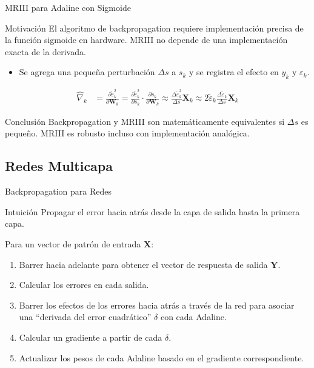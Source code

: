 \documentclass[aspectratio=169,utf8,spanish]{beamer}
\begin{document}
\begin{frame}{MRIII para Adaline con Sigmoide}
  \begin{block}{Motivación}
    El algoritmo de backpropagation requiere implementación precisa de la función sigmoide en hardware. MRIII no depende de una implementación exacta de la derivada.
  \end{block}

  \begin{itemize}
    \item Se agrega una pequeña perturbación $\Delta s$ a $s_k$ y se registra el efecto en $y_k$ y $\varepsilon_k$.
  \end{itemize}

  \begin{align*}
    \hat{\nabla}_k &= \frac{\partial \tilde{\varepsilon}_k^2}{\partial \mathbf{W}_k}
    = \frac{\partial \tilde{\varepsilon}_k^2}{\partial s_k} \cdot \frac{\partial s_k}{\partial \mathbf{W}_k}
    \approx \frac{\Delta\tilde{\varepsilon}_k^2}{\Delta s} \mathbf{X}_k
    \approx 2\tilde{\varepsilon}_k \frac{\Delta\tilde{\varepsilon}_k}{\Delta s} \mathbf{X}_k
  \end{align*}

  \begin{block}{Conclusión}
    Backpropagation y MRIII son matemáticamente equivalentes si $\Delta s$ es pequeño. MRIII es robusto incluso con implementación analógica.
  \end{block}
\end{frame}

\subsection{Redes Multicapa}

\begin{frame}{Backpropagation para Redes}
  \begin{block}{Intuición}
    Propagar el error hacia atrás desde la capa de salida hasta la primera capa.
  \end{block}

  Para un vector de patrón de entrada $\mathbf{X}$:
  \begin{enumerate}
    \item Barrer hacia adelante para obtener el vector de respuesta de salida $\mathbf{Y}$.
    \item Calcular los errores en cada salida.
    \item Barrer los efectos de los errores hacia atrás a través de la red para asociar una ``derivada del error cuadrático'' $\delta$ con cada Adaline.
    \item Calcular un gradiente a partir de cada $\delta$.
    \item Actualizar los pesos de cada Adaline basado en el gradiente correspondiente.
  \end{enumerate}
\end{frame}
\end{document}
